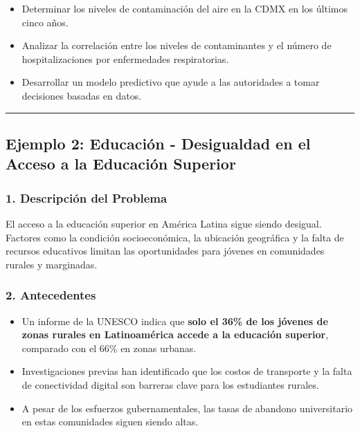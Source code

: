 \documentclass[
  letterpaper,
  DIV=11,
  numbers=noendperiod]{scrartcl}
\providecommand{\tightlist}{%
  \setlength{\itemsep}{0pt}\setlength{\parskip}{0pt}}
\begin{document}
\begin{itemize}
\tightlist
\item
  Determinar los niveles de contaminación del aire en la CDMX en los
  últimos cinco años.\\
\item
  Analizar la correlación entre los niveles de contaminantes y el número
  de hospitalizaciones por enfermedades respiratorias.\\
\item
  Desarrollar un modelo predictivo que ayude a las autoridades a tomar
  decisiones basadas en datos.
\end{itemize}

\begin{center}\rule{0.5\linewidth}{0.5pt}\end{center}

\subsection{\texorpdfstring{Ejemplo 2: \textbf{Educación - Desigualdad
en el Acceso a la Educación
Superior}}{Ejemplo 2: Educación - Desigualdad en el Acceso a la Educación Superior}}\label{ejemplo-2-educaciuxf3n---desigualdad-en-el-acceso-a-la-educaciuxf3n-superior}

\subsubsection{\texorpdfstring{\textbf{1. Descripción del
Problema}}{1. Descripción del Problema}}\label{descripciuxf3n-del-problema-1}

El acceso a la educación superior en América Latina sigue siendo
desigual. Factores como la condición socioeconómica, la ubicación
geográfica y la falta de recursos educativos limitan las oportunidades
para jóvenes en comunidades rurales y marginadas.

\subsubsection{\texorpdfstring{\textbf{2.
Antecedentes}}{2. Antecedentes}}\label{antecedentes-1}

\begin{itemize}
\tightlist
\item
  Un informe de la UNESCO indica que \textbf{solo el 36\% de los jóvenes
  de zonas rurales en Latinoamérica accede a la educación superior},
  comparado con el 66\% en zonas urbanas.\\
\item
  Investigaciones previas han identificado que los costos de transporte
  y la falta de conectividad digital son barreras clave para los
  estudiantes rurales.\\
\item
  A pesar de los esfuerzos gubernamentales, las tasas de abandono
  universitario en estas comunidades siguen siendo altas.
\end{itemize}
\end{document}
